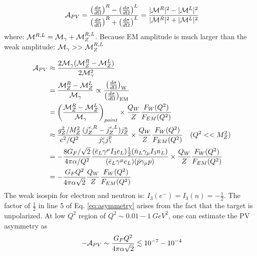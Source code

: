 \begin{equation}
    \mathcal{A}_{PV} = \frac{\left( \frac{d\sigma}{d\Omega} \right)^R - \left( \frac{d\sigma}{d\Omega} \right)^L}
    {\left( \frac{d\sigma}{d\Omega} \right)^R + \left( \frac{d\sigma}{d\Omega} \right)^L}
    = \frac{|\mathcal{M}^R|^2 - |\mathcal{M}^L|^2}{|\mathcal{M}^R|^2 + |\mathcal{M}^L|^2}
\end{equation}
where: $\mathcal{M}^{R, L} = \mathcal{M}_{\gamma} + \mathcal{M}_Z^{R,L}$. Because EM amplitude is much 
larger than the weak amplitude: $\mathcal{M}_\gamma >> \mathcal{M}_Z^{R, L}$

\begin{equation}
    \begin{aligned}
	\mathcal{A}_{PV} &\approx \frac{2\mathcal{M}_\gamma (\mathcal{M}_Z^R - \mathcal{M}_Z^L)}{2\mathcal{M}^2_\gamma}	\\
	    &= \frac{\mathcal{M}_Z^R - \mathcal{M}_Z^L}{\mathcal{M}_\gamma} \propto \frac{\left( \frac{d\sigma}{d\Omega} \right)_{\text{W}}}{\left( \frac{d\sigma}{d\Omega} \right)_{\text{EM}}}	\\
	    &= \left(\frac{\mathcal{M}_Z^R - \mathcal{M}_Z^L}{\mathcal{M}_\gamma}\right)_{point} \times \frac{Q_{W}}{Z}\frac{F_{W}(Q^2)}{F_{EM}(Q^2)}    \\
	    &\approx \frac{g^2_Z/M_Z^2}{e^2/Q^2} \frac{(j_Z^{e,R} - j_Z^{e,L}) j_Z^n}{j_\gamma^e j_\gamma^p}
		\times \frac{Q_{W}}{Z}\frac{F_{W}(Q^2)}{F_{EM}(Q^2)} 	\quad (Q^2 << M_Z^2) \\
	    &= -\frac{8G_F/\sqrt{2}}{4\pi\alpha/Q^2} 
		\frac{(\bar{e}_L\gamma^\mu I_3e_L) \frac{1}{2}(\bar{n}_L \gamma_\mu I_3 n_L)}{(\bar{e}_L\gamma^\mu e_L)(\bar{p}\gamma_\mu p)}
		\times \frac{Q_{W}}{Z}\frac{F_{W}(Q^2)}{F_{EM}(Q^2)}    \\
	    &= -\frac{G_F Q^2}{4\pi\alpha\sqrt{2}} \frac{Q_{W}}{Z}\frac{F_{W}(Q^2)}{F_{EM}(Q^2)}
    \end{aligned}
    \label{eq:asymmetry}
\end{equation}
The weak isospin for electron and neutron is: $I_3(e^-) = I_3(n) = -\frac{1}{2}$.
The factor of $\frac{1}{2}$ in line 5 of Eq. \ref{eq:asymmetry} arises from
the fact that the target is unpolarized. At low $Q^2$ region of $Q^2 \sim 0.01 - 1 \ GeV^2$,
one can estimate the PV asymmetry as 
\begin{equation}
    -\mathcal{A}_{PV} \sim \frac{G_F Q^2}{4\pi\alpha \sqrt{2}} \lesssim 10^{-7} - 10^{-4}
\end{equation}

